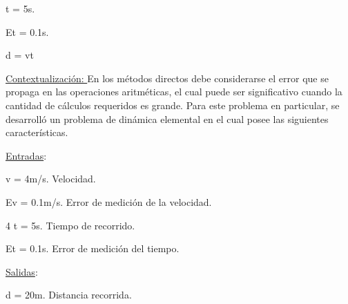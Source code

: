 \documentclass[12pt]{article}
\renewcommand{\_}{\kern-1.5pt\textunderscore\kern-1.5pt}
\begin{document}
\begin{enumerate}
\begin{justify}
t = 5s. 
\end{justify}\par

\begin{justify}
Et = 0.1s.
\end{justify}\par

\begin{justify}
 d = vt
\end{justify}\par


\vspace{\baselineskip}
\begin{justify}
\uline{Contextualización: }En los métodos directos debe considerarse el error que se propaga en las operaciones aritméticas, el cual puede ser significativo cuando la cantidad de cálculos requeridos es grande. Para este problema en particular, se desarrolló un problema de dinámica elemental en el cual posee las siguientes características.
\end{justify}\par

\begin{justify}
\uline{Entradas}:
\end{justify}\par

\begin{justify}
 v = 4m/s. Velocidad. 
\end{justify}\par

\begin{justify}
Ev = 0.1m/s. Error de medición de la velocidad. 
\end{justify}\par

\begin{justify}
4 t = 5s. Tiempo de recorrido. 
\end{justify}\par

\begin{justify}
Et = 0.1s. Error de medición del tiempo. 
\end{justify}\par

\begin{justify}
\uline{Salidas}: 
\end{justify}\par

\begin{justify}
d = 20m. Distancia recorrida. 
\end{justify}\par


\end{enumerate}
\end{document}
